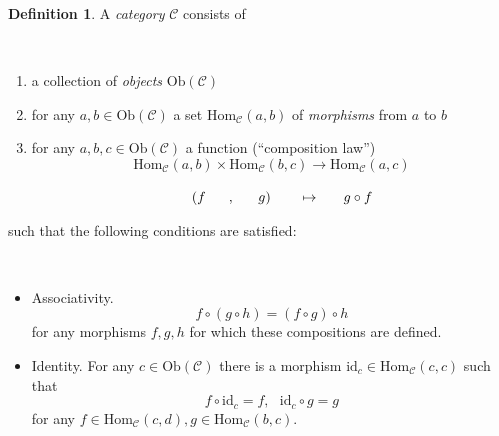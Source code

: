 \documentclass[12pt, letterpaper, oneside]{article}
\theoremstyle{plain}
\theoremstyle{definition}
\newtheorem{definition}[theorem]{Definition}
\newcommand{\Hom}{\mathrm{Hom}}
\newcommand{\Ob}{\mathrm{Ob}}
\newcommand{\id}{\mathrm{id}}
\newcommand{\CC}{{\mathcal C}}
\newcommand{\benu}{\begin{enumerate}}
\newcommand{\eenu}{\end{enumerate}}
\newcommand{\bit}{\begin{itemize}}
\newcommand{\eit}{\end{itemize}}
\newcommand{\vs}{\vskip 5mm}
\newcommand{\isep}[1][0]{\setlength{\itemsep}{#1 mm}}
\begin{document}
\begin{definition}
A \emph{category} $\CC$ consists of 

\vskip -13mm

\ 
\benu
\item a collection of \emph{objects} $\Ob(\CC)$ 
\item for any $a, b \in \Ob(\CC)$ a set $\Hom_{\CC}(a, b)$ of \emph{morphisms}
from $a$ to $b$
\item for any $a, b, c\in \Ob(\CC)$ a function (``composition law'') 
$$\Hom_{\CC}(a, b)\times \Hom_{\CC}(b, c) \to \Hom_{\CC}(a, c)$$

\vskip -4mm
$\hskip 40mm (f \ \ \ \ \ , \ \ \ \ \ g)\ \ \ \ \ \  \mapsto \ \ \ \ \ g\circ f$
\eenu

\vskip -4mm

such that the following conditions are satisfied:

\vskip -13mm

\ 
\bit
\isep[6]
\item Associativity.
$$f\circ (g \circ h) = (f\circ g) \circ h$$
for any morphisms $f, g, h$ for which these compositions are defined.

\item Identity. For any $c\in \Ob(\CC)$ there is a morphism $\id_{c}\in \Hom_{\CC}(c, c)$   
such that 
$$f\circ \id_{c} =f, \ \ \ \id_{c}\circ g = g$$
for any $f\in \Hom_{\CC}(c, d), g\in \Hom_{\CC}(b, c)$.
\eit
\end{definition}


\vs
\end{document}
